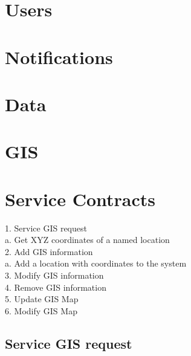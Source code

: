 \documentclass[english]{article}
\begin{document}

	\newpage

	\tableofcontents




	\newpage



\section{Users}










\section{Notifications}



\section{Data}



\section{GIS}

\section{Service Contracts}

1.	Service GIS request\\
	a.	Get XYZ coordinates of a named location\\
2.	Add GIS information\\
	a.	Add a location with coordinates to the system\\
3.	Modify GIS information\\
4.	Remove GIS information\\
5.	Update GIS Map\\
6.	Modify GIS Map\\




\subsection{Service GIS request}
\end{document}

